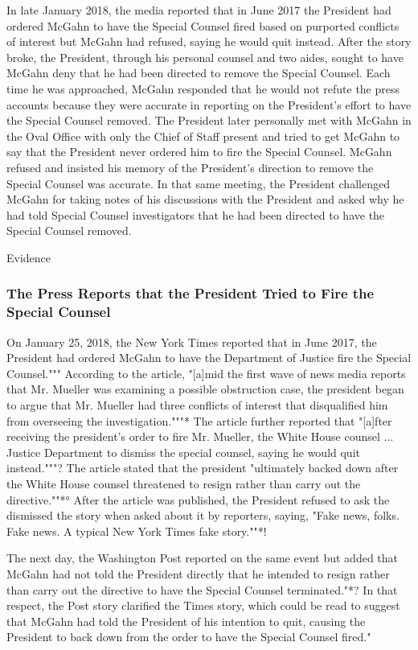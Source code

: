 In late January 2018, the media reported that in June 2017 the President had ordered McGahn to have the Special Counsel fired based on purported conflicts of interest but McGahn had refused, saying he would quit instead.
After the story broke, the President, through his personal counsel and two aides, sought to have McGahn deny that he had been directed to remove the Special Counsel.
Each time he was approached, McGahn responded that he would not refute the press accounts because they were accurate in reporting on the President's effort to have the Special Counsel removed.
The President later personally met with McGahn in the Oval Office with only the Chief of Staff present and tried to get McGahn to say that the President never ordered him to fire the Special Counsel.
McGahn refused and insisted his memory of the President's direction to remove the Special Counsel was accurate.
In that same meeting, the President challenged McGahn for taking notes of his discussions with the President and asked why he had told Special Counsel investigators that he had been directed to have the Special Counsel removed.

Evidence

\subsubsection{The Press Reports that the President Tried to Fire the Special Counsel}

On January 25, 2018, the New York Times reported that in June 2017, the President had ordered McGahn to have the Department of Justice fire the Special Counsel."""
According to the article, "[a]mid the first wave of news media reports that Mr. Mueller was examining a possible obstruction case, the president began to argue that Mr. Mueller had three conflicts of interest that disqualified him from overseeing the investigation."""*
The article further reported that "[a]fter
receiving the president's order to fire Mr. Mueller, the White House counsel ...
Justice Department to dismiss the special counsel, saying he would quit instead."""?
The article stated that the president "ultimately backed down after the White House counsel threatened to resign rather than carry out the directive.""*°
After the article was published, the President
refused to ask the
dismissed the story when asked about it by reporters, saying, "Fake news, folks.
Fake news.
A typical New York Times fake story.""*!

The next day, the Washington Post reported on the same event but added that McGahn had not told the President directly that he intended to resign rather than carry out the directive to have the Special Counsel terminated."*?
In that respect, the Post story clarified the Times story, which could be read to suggest that McGahn had told the President of his intention to quit, causing the President to back down from the order to have the Special Counsel fired."

